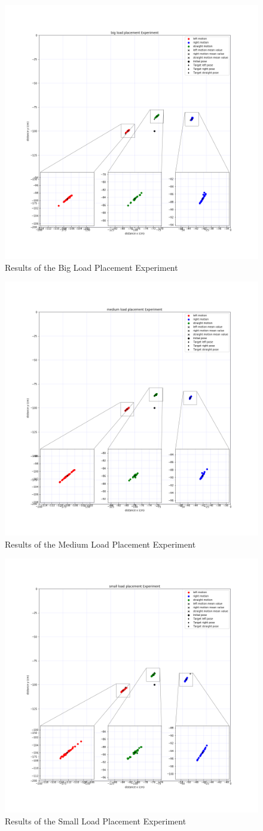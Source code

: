 \begin{figure}[ht!]
	\centering
	\includegraphics[width=0.6\linewidth]{images/combinedbig}
	\caption{Results of the Big Load Placement Experiment}
	\label{fig:combinedbig}
\end{figure}
\begin{figure}[ht!]
	\centering
	\includegraphics[width=0.6\linewidth]{images/combinedmedium}
	\caption{Results of the Medium Load Placement Experiment}
	\label{fig:combinedmedium}
\end{figure}
\begin{figure}[ht!]
	\centering
	\includegraphics[width=0.6\linewidth]{images/combinedsmall}
	\caption{Results of the Small Load Placement Experiment}
	\label{fig:combinedsmall}
\end{figure}




